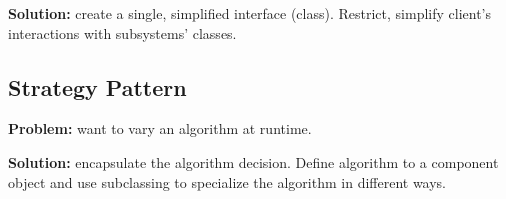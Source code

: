 \documentclass[12pt]{article}
\begin{document}
{\bf Solution:} create a single, simplified interface (class). Restrict, simplify client's interactions with subsystems' classes.

\subsection{Strategy Pattern}
{\bf Problem:} want to vary an algorithm at runtime.

{\bf Solution:} encapsulate the algorithm decision. Define algorithm to a component object and use subclassing to specialize the algorithm in different ways.
\end{document}
